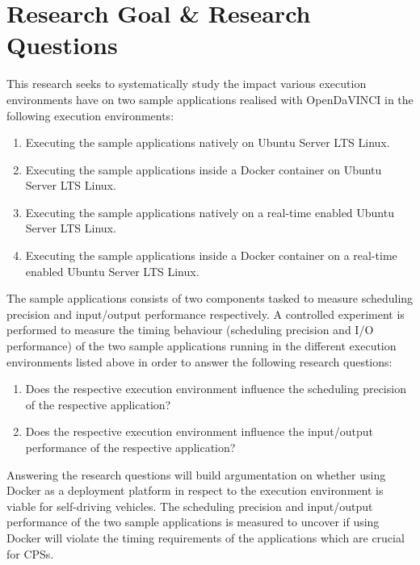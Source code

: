 \section{Research Goal \& Research Questions}

This research seeks to systematically study the impact various execution environments have on two sample applications realised with OpenDaVINCI in the following execution environments:\\ 

\begin{enumerate}
\item Executing the sample applications natively on Ubuntu Server LTS Linux.
\item Executing the sample applications inside a Docker container on Ubuntu Server LTS Linux.
\item Executing the sample applications natively on a real-time enabled Ubuntu Server LTS Linux.
\item Executing the sample applications inside a Docker container on a real-time enabled Ubuntu Server LTS Linux.\\
\end{enumerate}

The sample applications consists of two components tasked to measure scheduling precision and input/output performance respectively. 
A controlled experiment is performed to measure the timing behaviour (scheduling precision and I/O performance) of the two sample applications running in the different execution environments listed above in order to answer the following research questions:\\
\begin{enumerate}[label=\textbf{RQ\arabic*}]
\label{section:rqs}
	\item Does the respective execution environment influence the scheduling precision of the respective application?
	\item Does the respective execution environment influence the input/output performance of the respective application?\\
\end{enumerate}

Answering the research questions will build argumentation on whether using Docker as a deployment platform in respect to the execution environment is viable for self-driving vehicles. The scheduling precision and input/output performance of the two sample applications is measured to uncover if using Docker will violate the timing requirements of the applications which are crucial for CPSs.



